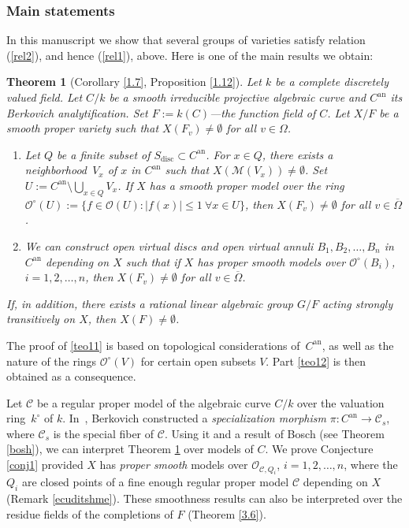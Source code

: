 \documentclass[JEP,XML,SOM,Unicode,NoFloatCountersInSection,published]{cedram}
\let\backslash\setminus
\newtheorem{thm}{Theorem}[section]
\theoremstyle{definition}
\begin{document}
\subsubsection*{Main statements}
In this manuscript we show that several groups of varieties satisfy relation (\ref{rel2}), and hence (\ref{rel1}), above. Here is one of the main results we obtain:
\begin{thm}[Corollary \ref{1.7}, Proposition \ref{1.12}] \label{teo1} Let $k$ be a complete discretely valued field. Let $C/k$ be a smooth irreducible projective algebraic curve and $C^{\mathrm{an}}$ its Berkovich analytification. Set $F:=k(C)$---the function field of $C$. Let $X/F$ be a smooth proper variety such that $X(F_v) \neq \emptyset$ for all $v \in \Omega$.
\begin{enumerate}
\item\label{teo11} Let $Q$ be a finite subset of $S_{\mathrm{disc}} \subset C^{\mathrm{an}}$. For $x \in Q$, there exists a neighborhood~$V_x$ of $x$ in $C^{\mathrm{an}}$ such that $X(\mathscr{M}(V_x)) \neq \emptyset$.
Set $U:=C^{\mathrm{an}} \backslash \bigcup_{x \in Q} V_x$.
If $X$ has a \emph{smooth proper} model over the ring $\mathcal{O}^{\circ}(U):=\{f \in \mathcal{O}(U): |f(x)| \leqslant 1 \ \forall x \in U\}$, then $X(F_v) \neq \emptyset$ for all $v \in \overline{\Omega}$.
\item\label{teo12}
We can construct open \emph{virtual discs} and open \emph{virtual annuli} $B_1, B_2, \dots, B_n$ in~$C^{\mathrm{an}}$ depending on $X$ such that if $X$ has proper smooth models over $\mathcal{O}^{\circ}(B_i)$, ${i=1,2,\dots, n}$, then $X(F_v) \neq \emptyset$ for all $v \in \overline{\Omega}$.
\end{enumerate}

If, in addition, there exists a rational linear algebraic group $G/F$ acting strongly transitively on $X$, then $X(F) \neq \emptyset$.
\end{thm}
The proof of \eqref{teo11} is based on topological considerations of~$C^{\mathrm{an}}$, as well as the nature of the rings $\mathcal{O}^{\circ}(V)$ for certain open subsets $V$. Part \eqref{teo12} is then obtained as a consequence.

Let $\mathcal{C}$ be a regular proper model of the algebraic curve $C/k$ over the valuation ring~$k^{\circ}$ of $k$.
In~\cite{ber}, Berkovich constructed a \emph{specialization morphism} $\pi: C^{\mathrm{an}} \to \mathcal{C}_s$, where $\mathcal{C}_s$ is the special fiber of $\mathcal{C}$. Using it and a result of Bosch (see Theorem \ref{bosh}), we can interpret Theorem \ref{teo1} over models of $C$. We prove Conjecture \ref{conj1} provided $X$ has \emph{proper smooth} models over $\mathcal{O}_{\mathscr{C}, Q_i}$, $i=1,2,\dots, n$, where the $Q_i$ are closed points of a fine enough regular proper model $\mathscr{C}$ depending on $X$ (\cf Remark \ref{ecuditshme}).
These smoothness results can also be interpreted over the residue fields of the completions of $F$ (Theorem \ref{3.6}).
\end{document}

